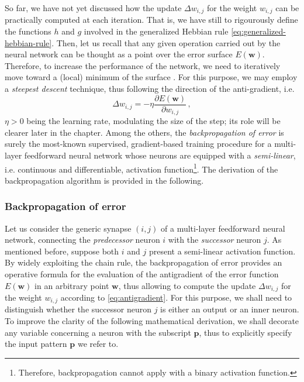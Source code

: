 \documentclass[11pt, a4paper]{report}
\numberwithin{equation}{chapter}
\theoremstyle{theorem}
\theoremstyle{definition}
\numberwithin{figure}{section}
\begin{document}
		So far, we have not yet discussed how the update $\Delta w_{i,j}$ for the weight $w_{i,j}$ can be practically computed at each iteration. That is, we have still to rigourously define the functions $h$ and $g$ involved in the generalized Hebbian rule \eqref{eq:generalized-hebbian-rule}. Then, let us recall that any given operation carried out by the neural network can be thought as a point over the error surface $E(\boldsymbol{w})$. Therefore, to increase the performance of the network, we need to iteratively move toward a (local) minimum of the surface \cite{Hay05}. For this purpose, we may employ a \emph{steepest descent} technique, thus following the direction of the anti-gradient, i.e.
		\begin{equation}
			\label{eq:antigradient}
			\Delta w_{i,j} = - \eta \dfrac{\partial E(\boldsymbol{w})}{\partial w_{i,j}} \, ,
		\end{equation}
		$\eta > 0$ being the learning rate, modulating the size of the step; its role will be clearer later in the chapter. Among the others, the \emph{backpropagation of error} \cite{MR86} is surely the most-known supervised, gradient-based training procedure for a multi-layer feedforward neural network whose neurons are equipped with a \emph{semi-linear}, i.e. continuous and differentiable, activation function\footnote{Therefore, backpropagation cannot apply with a binary activation function.}. The derivation of the backpropagation algorithm is provided in the following.
		
	\subsubsection{Backpropagation of error}
	\label{section:Backpropagation of error}
		
		Let us consider the generic synapse $(i,j)$ of a multi-layer feedforward neural network, connecting the \emph{predecessor} neuron $i$ with the \emph{successor} neuron $j$. As mentioned before, suppose both $i$ and $j$ present a semi-linear activation function. By widely exploiting the chain rule, the backpropagation of error provides an operative formula for the evaluation of the antigradient of the error function $E(\boldsymbol{w})$ in an arbitrary point $\boldsymbol{w}$, thus allowing to compute the update $\Delta w_{i,j}$ for the weight $w_{i,j}$ according to \eqref{eq:antigradient}. For this purpose, we shall need to distinguish whether the successor neuron $j$ is either an output or an inner neuron. To improve the clarity of the following mathematical derivation, we shall decorate any variable concerning a neuron with the subscript $\boldsymbol{p}$, thus to explicitly specify the input pattern $\boldsymbol{p}$ we refer to.
		
\end{document}
